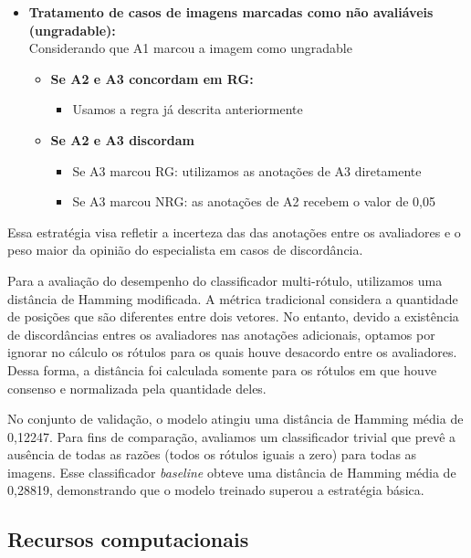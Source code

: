 \documentclass[12pt]{article}
\begin{document}
\begin{itemize}[noitemsep]
    \item \textbf{Tratamento de casos de imagens marcadas como não avaliáveis (ungradable):}\\
    Considerando que A1 marcou a imagem como ungradable
    \begin{itemize}[noitemsep]
        \item \textbf{Se A2 e A3 concordam em RG:}
        \begin{itemize}[noitemsep]
            \item Usamos a regra já descrita anteriormente
        \end{itemize}
        
        \item \textbf{Se A2 e A3 discordam}
        \begin{itemize}[noitemsep]
            \item Se A3 marcou RG: utilizamos as anotações de A3 diretamente
            \item Se A3 marcou NRG: as anotações de A2 recebem o valor de 0,05
        \end{itemize}
    \end{itemize}
    
\end{itemize}

Essa estratégia visa refletir a incerteza das das anotações entre os avaliadores e o peso maior da opinião do especialista em casos de discordância.

Para a avaliação do desempenho do classificador multi-rótulo, utilizamos uma distância de Hamming modificada. A métrica tradicional considera a quantidade de posições que são diferentes entre dois vetores. No entanto, devido a existência de discordâncias entres os avaliadores nas anotações adicionais, optamos por ignorar no cálculo os rótulos para os quais houve desacordo entre os avaliadores. Dessa forma, a distância foi calculada somente para os rótulos em que houve consenso e normalizada pela quantidade deles. 

No conjunto de validação, o modelo atingiu uma distância de Hamming média de 0,12247. Para fins de comparação, avaliamos um classificador trivial que prevê a ausência de todas as razões (todos os rótulos iguais a zero) para todas as imagens. Esse classificador \textit{baseline} obteve uma distância de Hamming média de 0,28819, demonstrando que o modelo treinado superou a estratégia básica.

\subsection{Recursos computacionais}
\label{sec:resources}
\end{document}
